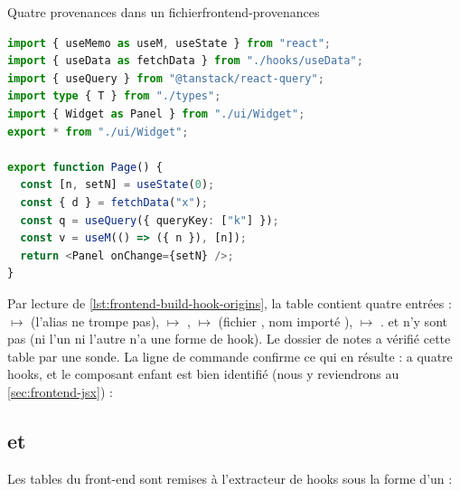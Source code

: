 \begin{exemple}{Quatre provenances dans un fichier}{frontend-provenances}
\begin{lstlisting}[language=TypeScript,caption={\file{/tmp/ra-ex/e5/Page.tsx} (fichiers \file{hooks/useData.ts}, \file{ui/Widget.tsx}, \file{types.ts} présents)}]
import { useMemo as useM, useState } from "react";
import { useData as fetchData } from "./hooks/useData";
import { useQuery } from "@tanstack/react-query";
import type { T } from "./types";
import { Widget as Panel } from "./ui/Widget";
export * from "./ui/Widget";

export function Page() {
  const [n, setN] = useState(0);
  const { d } = fetchData("x");
  const q = useQuery({ queryKey: ["k"] });
  const v = useM(() => ({ n }), [n]);
  return <Panel onChange={setN} />;
}
\end{lstlisting}
Par lecture de \cref{lst:frontend-build-hook-origins}, la table contient quatre entrées :  $\mapsto$  (l'alias ne trompe pas),  $\mapsto$ ,  $\mapsto$  (fichier , nom importé ),  $\mapsto$ .  et  n'y sont pas (ni l'un ni l'autre n'a une forme de hook). Le dossier de notes a vérifié cette table par une sonde. La ligne de commande confirme ce qui en résulte :  a quatre hooks, et le composant enfant est bien identifié (nous y reviendrons au \cref{sec:frontend-jsx}) :
\end{exemple}

\subsection{ et }

Les tables du front-end sont remises à l'extracteur de hooks sous la forme d'un  :

